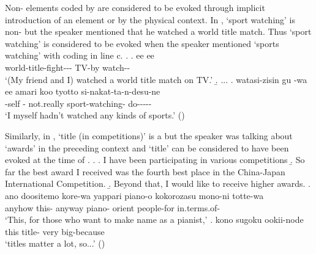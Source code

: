 
Non- elements coded by  are considered to be evoked
through implicit introduction of an element or by the physical context.
In \Next,
 `sport watching' is non-
but the speaker mentioned that he watched a world title match.
Thus `sport watching' is considered to be evoked
when the speaker mentioned `sports watching' with  coding in line c.
%
\ex. \ag. ee  ee   \\
		 world-title-fight---  TV-by watch-- \\
		`(My friend and I) watched a world title match on TV.'
	\b. ...
	\bg. watasi-zisin gu -wa ee amari koo  tyotto si-nakat-ta-n-desu-ne \\
		-self  -  not.really  sport-watching-  do----- \\
		`I myself hadn't watched any kinds of sports.' \hfill{()}
%	

Similarly, in \Next,
 `title (in  competitions)' is a 
but the speaker was talking about `awards' in the preceding context
and `title' can be considered to have been evoked at the time of  \Next[e].
%
\ex. \a. I have been participating in various  competitions
	\b. So far the best award I received was the fourth best place in the China-Japan International Competition.
	\b. Beyond that, I would like to receive higher awards.
	\bg. ano doositemo kore-wa yappari piano-o kokorozasu mono-ni totte-wa \\
		 anyhow this- anyway piano- orient people-for in.terms.of- \\
		`This, for those who want to make name as a pianist,'
	\bg. kono  sugoku ookii-node \\
		this title- very big-because \\
		`titles matter a lot, so...'
\hfill{()}
%

